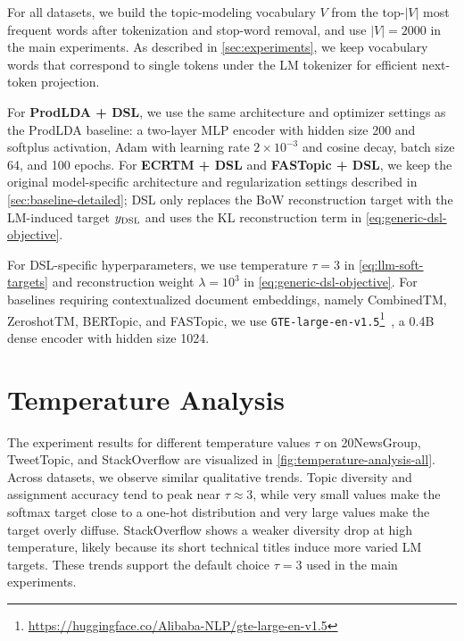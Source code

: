 \documentclass{article}
\theoremstyle{plain}
\theoremstyle{definition}
\theoremstyle{remark}
\begin{document}
For all datasets, we build the topic-modeling vocabulary $V$ from the top-$|V|$ most frequent words after tokenization and stop-word removal, and use $|V|=2000$ in the main experiments. As described in \autoref{sec:experiments}, we keep vocabulary words that correspond to single tokens under the LM tokenizer for efficient next-token projection.

For \textbf{ProdLDA + DSL}, we use the same architecture and optimizer settings as the ProdLDA baseline: a two-layer MLP encoder with hidden size 200 and softplus activation, Adam with learning rate $2\times10^{-3}$ and cosine decay, batch size 64, and 100 epochs. For \textbf{ECRTM + DSL} and \textbf{FASTopic + DSL}, we keep the original model-specific architecture and regularization settings described in \autoref{sec:baseline-detailed}; DSL only replaces the BoW reconstruction target with the LM-induced target $y_{\rm DSL}$ and uses the KL reconstruction term in \autoref{eq:generic-dsl-objective}.

For DSL-specific hyperparameters, we use temperature $\tau=3$ in \autoref{eq:llm-soft-targets} and reconstruction weight $\lambda=10^3$ in \autoref{eq:generic-dsl-objective}. For baselines requiring contextualized document embeddings, namely CombinedTM, ZeroshotTM, BERTopic, and FASTopic, we use \texttt{GTE-large-en-v1.5}\footnote{\url{https://huggingface.co/Alibaba-NLP/gte-large-en-v1.5}}~\citep{zhang-etal-2024-mgte}, a 0.4B dense encoder with hidden size 1024.

\section{Temperature Analysis}
\label{sec:temperature-analysis-all}

The experiment results for different temperature values $\tau$ on 20NewsGroup, TweetTopic, and StackOverflow are visualized in \autoref{fig:temperature-analysis-all}. Across datasets, we observe similar qualitative trends. Topic diversity and assignment accuracy tend to peak near $\tau\approx3$, while very small values make the softmax target close to a one-hot distribution and very large values make the target overly diffuse. StackOverflow shows a weaker diversity drop at high temperature, likely because its short technical titles induce more varied LM targets. These trends support the default choice $\tau=3$ used in the main experiments.
\end{document}
